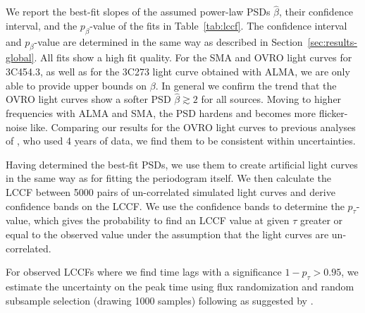 \documentclass[twocolumn,linenumbers]{aastex62}
\begin{document}
We report the best-fit slopes of the assumed power-law PSDs $\hat{\beta}$, their confidence interval, and the $p_\beta$-value of the fits in Table~\ref{tab:lccf}.
The confidence interval and $p_\beta$-value are determined in the same way as described in Section~\ref{sec:results-global}.
All fits show a high fit quality. 
For the SMA and OVRO light curves for 3C454.3, as well as for the 3C273 light curve obtained with ALMA, we are only able to provide upper bounds on $\beta$.
In general we confirm the trend that the OVRO light curves show a softer PSD $\hat{\beta} \gtrsim 2$ for all sources. 
Moving to higher frequencies with ALMA and SMA, the PSD hardens and becomes more flicker-noise like. 
Comparing our results for the OVRO light curves to previous analyses of \citet{2014MNRAS.445..428M}, who used 4 years of data, we find them to be consistent within uncertainties. 

Having determined the best-fit PSDs, we use them to create artificial light curves in the same way as for fitting the periodogram itself.
We then calculate the LCCF between 5000 pairs of un-correlated simulated light curves and derive confidence bands on the LCCF. We use the confidence bands to determine the $p_\tau$-value, which gives the probability to find an LCCF value at given $\tau$ greater or equal to the observed value under the assumption that the light curves are un-correlated. 

For observed LCCFs where we find time lags with a significance $1 - p_\tau > 0.95$, we estimate the uncertainty on the peak time using flux randomization and random subsample selection (drawing 1000 samples) following \citet{1998PASP..110..660P} as suggested by \citet{2014MNRAS.445..437M}.
\end{document}
